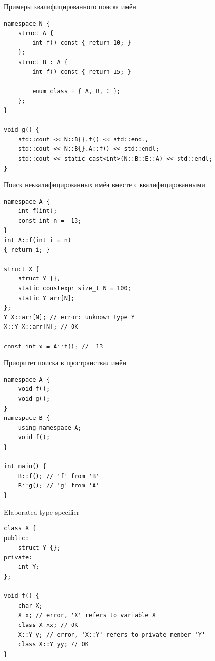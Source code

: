 \documentclass[unknownkeysallowed,xcolor=table]{beamer}
\begin{document}
\begin{frame}[fragile]{Примеры квалифицированного поиска имён}
\begin{lstlisting}
namespace N {   
    struct A {
        int f() const { return 10; }
    };
    struct B : A {
        int f() const { return 15; }
        
        enum class E { A, B, C };
    };
}

void g() {
    std::cout << N::B{}.f() << std::endl;
    std::cout << N::B{}.A::f() << std::endl;
    std::cout << static_cast<int>(N::B::E::A) << std::endl;
}
\end{lstlisting}
\end{frame}

\begin{frame}[fragile]{Поиск неквалифицированных имён вместе с квалифицированными}
\begin{lstlisting}
namespace A {
    int f(int);
    const int n = -13;
}
int A::f(int i = n)
{ return i; }

struct X {
    struct Y {};
    static constexpr size_t N = 100;
    static Y arr[N];
};
Y X::arr[N]; // error: unknown type Y
X::Y X::arr[N]; // OK

const int x = A::f(); // -13
\end{lstlisting}
\end{frame}

\begin{frame}[fragile]{Приоритет поиска в пространствах имён}
\begin{lstlisting}
namespace A {
    void f();
    void g();
}
namespace B {
    using namespace A;
    void f();
}

int main() {
    B::f(); // 'f' from 'B'
    B::g(); // 'g' from 'A'
}
\end{lstlisting}
\end{frame}

\begin{frame}[fragile]{Elaborated type specifier}
\begin{lstlisting}
class X {
public:
    struct Y {};
private:
    int Y;
};

void f() {
    char X;
    X x; // error, 'X' refers to variable X
    class X xx; // OK
    X::Y y; // error, 'X::Y' refers to private member 'Y'
    class X::Y yy; // OK
}
\end{lstlisting}
\end{frame}
\end{document}
